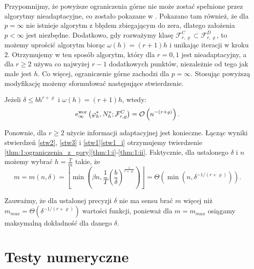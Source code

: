 \documentclass[oik, pdftex, man]{mgrwms}
\begin{document}
    Przypomnijmy, że powyższe ograniczenia górne nie może zostać spełnione przez algorytmy nieadaptacyjne, co zostało pokazane w \cite{PoA}. Pokazano tam również, że dla $p=\infty$ nie istnieje algorytm z błędem zbiegającym do zera, dlatego założenia $p < \infty$ jest niezbędne. Dodatkowo, gdy rozważymy klasę $\mathcal{F}_{r, \varrho}^{C} \subset \mathcal{F}_{r, \varrho}^{D}$, to możemy uprościć algorytm biorąc $\omega(h) = (r+1)h$ i unikając iteracji w kroku 2. Otrzymujemy w ten sposób algorytm, który dla $r=0,1$ jest nieadaptacyjny, a dla $r \geq 2$ używa co najwyżej $r-1$ dodatkowych punktów, niezależnie od tego jak małe jest $h$. Co więcej, ograniczenie górne zachodzi dla $p = \infty$.
    Stosując powyższą modyfikację możemy sformułować następujące stwierdzenie.

    \begin{stw}
        \label{stw3}
        Jeżeli $\delta \leq bh^{r+\varrho}$ i $\omega(h) = (r+1)h$, wtedy:
        \begin{equation}
            \mathrm{e}_{\infty}^{\mathrm{\mathrm{wor}}}\left(\varphi_{h}^{*}, N_{h}^{*} ; \mathcal{F}_{r, \varrho}^{C}\right)=\mathcal{O}\left(n^{-(r+\varrho)}\right) .
        \end{equation}
    \end{stw}

    Ponownie, dla $r \geq 2$ użycie informacji adaptacyjnej jest konieczne. Łącząc wyniki stwierdzeń \ref{stw2}, \ref{stw3} i \ref{stw1}\ref{stw1_i} otrzymujemy twierdzenie \ref{thm:1:ograniczenia_z_gory}\ref{thm:1:i}-\ref{thm:1:ii}.
    Faktycznie, dla ustalonego $\delta$ i $n$ możemy wybrać $h = \frac{T}{m}$ takie, że
    \begin{equation}
        m = m(n, \delta)=\left\lfloor\min \left(\beta n, \frac{1}{T}\left(\frac{b}{\delta}\right)^{\frac{1}{r+\varrho}}\right)\right\rfloor=\varTheta\left(\min \left(n, \delta^{-1 /(r+\varrho)}\right)\right).
    \end{equation}

    \begin{uw} \label{uw:2}
        Zauważmy, że dla ustalonej precyzji $\delta$ nie ma sensu brać $m$ więcej niż $m_{max} = \varTheta(\delta^{-1 / (r+\varrho)})$ wartości funkcji, ponieważ dla $m = m_{max}$ osiągamy maksymalną dokładność dla danego $\delta$.
    \end{uw}

\mgrclosechapter


\chapter{Testy numeryczne}
\end{document}
